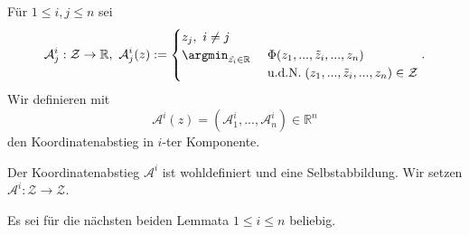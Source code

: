 \begin{definition}
	Für $1 \leq i,j \leq n$ sei
	$$
	\mathcal{A}^i_j : \mathcal{Z} \rightarrow \mathbb{R}, \ \mathcal{A}^i_j(z) := 
	\begin{cases} 
		z_j ,\ i \neq j  \\ 
		\argmin_{\tilde{z_i} \in \mathbb{R}} \
		& \Phi(z_1,...,\tilde{z}_i,...,z_n) \\
		& \text{u.d.N.} \; (z_1,...,\tilde{z}_i,...,z_n) \in \mathcal{Z} 
	\end{cases}.
	$$
	Wir definieren mit
	$$
	\mathcal{A}^i(z) = (\mathcal{A}^i_1,...,\mathcal{A}^i_n) \in \mathbb{R}^n
	$$
	den Koordinatenabstieg in $i$-ter Komponente.
\end{definition}

\begin{bemerkung}
Der Koordinatenabstieg $\mathcal{A}^i$ ist wohldefiniert und eine Selbstabbildung. Wir setzen $\mathcal{A}^i : \mathcal{Z} \rightarrow \mathcal{Z}$.
\end{bemerkung}

Es sei für die nächsten beiden Lemmata $1\leq i \leq n$ beliebig.

